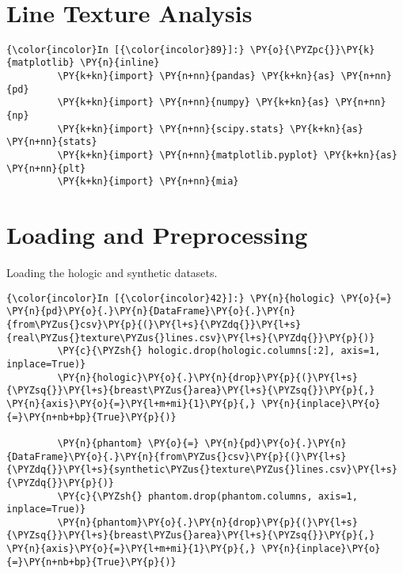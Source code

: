     \begin{center}
    \end{center}
    { \hspace*{\fill} \\}


\section*{Line Texture Analysis}




    \begin{Verbatim}[commandchars=\\\{\}]
{\color{incolor}In [{\color{incolor}89}]:} \PY{o}{\PYZpc{}}\PY{k}{matplotlib} \PY{n}{inline}
         \PY{k+kn}{import} \PY{n+nn}{pandas} \PY{k+kn}{as} \PY{n+nn}{pd}
         \PY{k+kn}{import} \PY{n+nn}{numpy} \PY{k+kn}{as} \PY{n+nn}{np}
         \PY{k+kn}{import} \PY{n+nn}{scipy.stats} \PY{k+kn}{as} \PY{n+nn}{stats}
         \PY{k+kn}{import} \PY{n+nn}{matplotlib.pyplot} \PY{k+kn}{as} \PY{n+nn}{plt}
         \PY{k+kn}{import} \PY{n+nn}{mia}
\end{Verbatim}

    \section{Loading and Preprocessing}\label{loading-and-preprocessing}

    Loading the hologic and synthetic datasets.

    \begin{Verbatim}[commandchars=\\\{\}]
{\color{incolor}In [{\color{incolor}42}]:} \PY{n}{hologic} \PY{o}{=} \PY{n}{pd}\PY{o}{.}\PY{n}{DataFrame}\PY{o}{.}\PY{n}{from\PYZus{}csv}\PY{p}{(}\PY{l+s}{\PYZdq{}}\PY{l+s}{real\PYZus{}texture\PYZus{}lines.csv}\PY{l+s}{\PYZdq{}}\PY{p}{)}
         \PY{c}{\PYZsh{} hologic.drop(hologic.columns[:2], axis=1, inplace=True)}
         \PY{n}{hologic}\PY{o}{.}\PY{n}{drop}\PY{p}{(}\PY{l+s}{\PYZsq{}}\PY{l+s}{breast\PYZus{}area}\PY{l+s}{\PYZsq{}}\PY{p}{,} \PY{n}{axis}\PY{o}{=}\PY{l+m+mi}{1}\PY{p}{,} \PY{n}{inplace}\PY{o}{=}\PY{n+nb+bp}{True}\PY{p}{)}

         \PY{n}{phantom} \PY{o}{=} \PY{n}{pd}\PY{o}{.}\PY{n}{DataFrame}\PY{o}{.}\PY{n}{from\PYZus{}csv}\PY{p}{(}\PY{l+s}{\PYZdq{}}\PY{l+s}{synthetic\PYZus{}texture\PYZus{}lines.csv}\PY{l+s}{\PYZdq{}}\PY{p}{)}
         \PY{c}{\PYZsh{} phantom.drop(phantom.columns, axis=1, inplace=True)}
         \PY{n}{phantom}\PY{o}{.}\PY{n}{drop}\PY{p}{(}\PY{l+s}{\PYZsq{}}\PY{l+s}{breast\PYZus{}area}\PY{l+s}{\PYZsq{}}\PY{p}{,} \PY{n}{axis}\PY{o}{=}\PY{l+m+mi}{1}\PY{p}{,} \PY{n}{inplace}\PY{o}{=}\PY{n+nb+bp}{True}\PY{p}{)}
\end{Verbatim}


